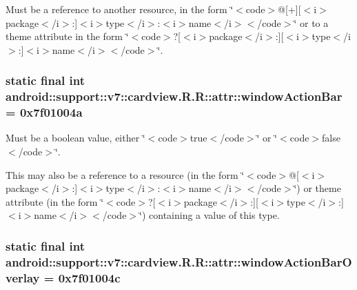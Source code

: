 Must be a reference to another resource, in the form \char`\"{}$<$code$>$@\mbox{[}+\mbox{]}\mbox{[}$<$i$>$package$<$/i$>$:\mbox{]}$<$i$>$type$<$/i$>$:$<$i$>$name$<$/i$>$$<$/code$>$\char`\"{} or to a theme attribute in the form \char`\"{}$<$code$>$?\mbox{[}$<$i$>$package$<$/i$>$:\mbox{]}\mbox{[}$<$i$>$type$<$/i$>$:\mbox{]}$<$i$>$name$<$/i$>$$<$/code$>$\char`\"{}. \hypertarget{classandroid_1_1support_1_1v7_1_1cardview_1_1_r_1_1attr_0ab751b9d8ab53d93b47a99c71f73199}{
\subsubsection[{windowActionBar}]{\setlength{\rightskip}{0pt plus 5cm}static final int android::support::v7::cardview.R.R::attr::windowActionBar = 0x7f01004a}}
\label{classandroid_1_1support_1_1v7_1_1cardview_1_1_r_1_1attr_0ab751b9d8ab53d93b47a99c71f73199}


Must be a boolean value, either \char`\"{}$<$code$>$true$<$/code$>$\char`\"{} or \char`\"{}$<$code$>$false$<$/code$>$\char`\"{}. 

This may also be a reference to a resource (in the form \char`\"{}$<$code$>$@\mbox{[}$<$i$>$package$<$/i$>$:\mbox{]}$<$i$>$type$<$/i$>$:$<$i$>$name$<$/i$>$$<$/code$>$\char`\"{}) or theme attribute (in the form \char`\"{}$<$code$>$?\mbox{[}$<$i$>$package$<$/i$>$:\mbox{]}\mbox{[}$<$i$>$type$<$/i$>$:\mbox{]}$<$i$>$name$<$/i$>$$<$/code$>$\char`\"{}) containing a value of this type. \hypertarget{classandroid_1_1support_1_1v7_1_1cardview_1_1_r_1_1attr_e64843357226f7bf71664b63eb9fea71}{
\subsubsection[{windowActionBarOverlay}]{\setlength{\rightskip}{0pt plus 5cm}static final int android::support::v7::cardview.R.R::attr::windowActionBarOverlay = 0x7f01004c}}
\label{classandroid_1_1support_1_1v7_1_1cardview_1_1_r_1_1attr_e64843357226f7bf71664b63eb9fea71}


